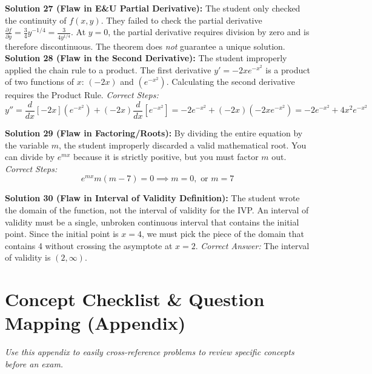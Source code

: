 \documentclass[12pt]{article}
\begin{document}
\noindent \textbf{Solution 27 (Flaw in E\&U Partial Derivative):} The student only checked the continuity of $f(x,y)$. They failed to check the partial derivative $\frac{\partial f}{\partial y} = \frac{3}{4}y^{-1/4} = \frac{3}{4 y^{1/4}}$. At $y=0$, the partial derivative requires division by zero and is therefore discontinuous. The theorem does \textit{not} guarantee a unique solution. \\

\noindent \textbf{Solution 28 (Flaw in the Second Derivative):} The student improperly applied the chain rule to a product. The first derivative $y' = -2x e^{-x^2}$ is a product of two functions of $x$: $(-2x)$ and $(e^{-x^2})$. Calculating the second derivative requires the Product Rule.
\textit{Correct Steps:}
$$y'' = \frac{d}{dx}[-2x](e^{-x^2}) + (-2x)\frac{d}{dx}[e^{-x^2}] = -2e^{-x^2} + (-2x)(-2x e^{-x^2}) = -2e^{-x^2} + 4x^2 e^{-x^2}$$

\noindent \textbf{Solution 29 (Flaw in Factoring/Roots):} By dividing the entire equation by the variable $m$, the student improperly discarded a valid mathematical root. You can divide by $e^{mx}$ because it is strictly positive, but you must factor $m$ out.
\textit{Correct Steps:}
$$e^{mx} m (m - 7) = 0 \implies m = 0, \text{ or } m = 7$$

\noindent \textbf{Solution 30 (Flaw in Interval of Validity Definition):} The student wrote the domain of the function, not the interval of validity for the IVP. An interval of validity must be a single, unbroken continuous interval that contains the initial point. Since the initial point is $x=4$, we must pick the piece of the domain that contains 4 without crossing the asymptote at $x=2$.
\textit{Correct Answer:} The interval of validity is $(2, \infty)$.

\newpage

\section{Concept Checklist \& Question Mapping (Appendix)}
\textit{Use this appendix to easily cross-reference problems to review specific concepts before an exam.}
\end{document}
